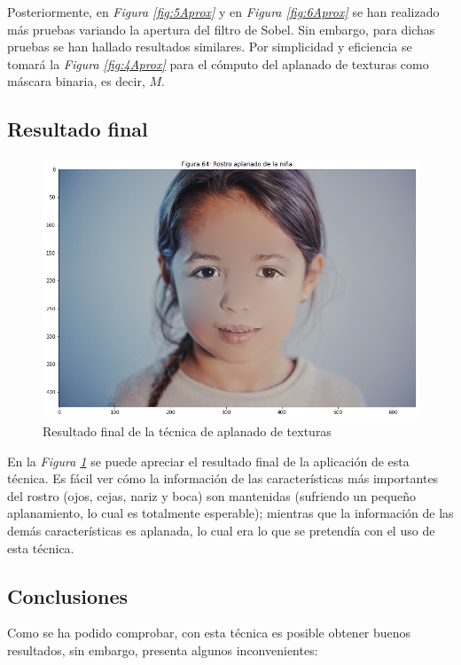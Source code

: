 \documentclass[11pt,twoside,titlepage,a4paper]{article}
\numberwithin{equation}{section} %
\theoremstyle{usual}
\begin{document}
Posteriormente, en \textit{Figura \ref{fig:5Aprox}} y en \textit{Figura \ref{fig:6Aprox}} se han realizado más pruebas variando la apertura del filtro de Sobel. Sin embargo, para dichas pruebas se han hallado resultados similares. Por simplicidad y eficiencia se tomará la \textit{Figura \ref{fig:4Aprox}} para el cómputo del aplanado de texturas como máscara binaria, es decir, $M$.

\subsection{Resultado final}

\begin{figure}[h]
    \centering
    \includegraphics[width=.5\textwidth]{imagenes/PoissonImageEditing_cell_73_output_0.png}
    \caption{Resultado final de la técnica de aplanado de texturas}
    \label{fig:resultadoAplanadoTexturas}
\end{figure}

En la \textit{Figura \ref{fig:resultadoAplanadoTexturas}} se puede apreciar el resultado final de la aplicación de esta técnica. Es fácil ver cómo la información de las características más importantes del rostro (ojos, cejas, nariz y boca) son mantenidas (sufriendo un pequeño aplanamiento, lo cual es totalmente esperable); mientras que la información de las demás características es aplanada, lo cual era lo que se pretendía con el uso de esta técnica.

\subsection{Conclusiones}

Como se ha podido comprobar, con esta técnica es posible obtener buenos resultados, sin embargo, presenta algunos inconvenientes:
\end{document}
